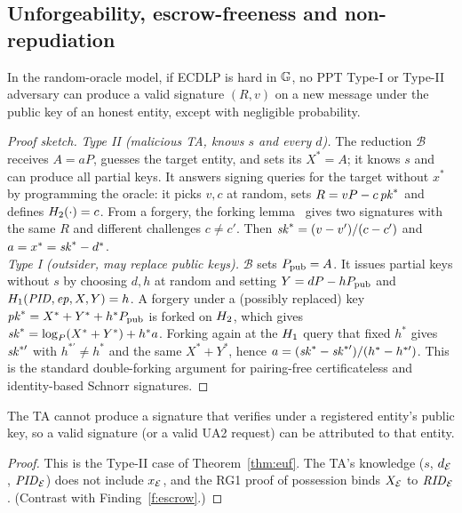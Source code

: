 \subsection{Unforgeability, escrow-freeness and non-repudiation}
\begin{theorem}\label{thm:euf}
In the random-oracle model, if ECDLP is hard in $\mathbb{G}$, no PPT Type-I or Type-II adversary can produce a valid signature $(R,v)$ on a new message under the
public key of an honest entity, except with negligible probability.
\end{theorem}
\begin{proof}[Proof sketch]
\emph{Type II (malicious TA, knows $s$ and every $d$).} The reduction $\mathcal{B}$ receives $A=aP$, guesses the target entity, and sets its
$X^*=A$; it knows $s$ and can produce all partial keys. It answers signing queries for the target without $x^*$ by programming the oracle: it picks
$v,c$ at random, sets $R=vP-c\,\mathit{pk}^*$ and defines $H_2(\cdot)=c$. From a forgery, the forking lemma~\cite{forking} gives two signatures with the same $R$ and
different challenges $c\ne c'$. Then $\mathit{sk}^*=(v-v')/(c-c')$ and $a=x^*=\mathit{sk}^*-d^*$.\\
\emph{Type I (outsider, may replace public keys).} $\mathcal{B}$ sets $P_{\mathrm{pub}}=A$. It issues partial keys without $s$ by choosing $d,h$ at random and setting
$Y=dP-hP_{\mathrm{pub}}$ and $H_1(\mathit{PID},\mathit{ep},X,Y)=h$. A forgery under a (possibly replaced) key $\mathit{pk}^*=X^*+Y^*+h^*P_{\mathrm{pub}}$ is forked on $H_2$, which gives
$\mathit{sk}^*=\log_P(X^*+Y^*)+h^*a$. Forking again at the $H_1$ query that fixed $h^*$ gives $\mathit{sk}^{*\prime}$ with $h^{*\prime}\ne h^*$ and the same $X^*+Y^*$, hence
$a=(\mathit{sk}^*-\mathit{sk}^{*\prime})/(h^*-h^{*\prime})$. This is the standard double-forking argument for pairing-free certificateless and identity-based Schnorr signatures.
\end{proof}

\begin{theorem}\label{thm:escrow}
The TA cannot produce a signature that verifies under a registered entity's public key, so a valid signature (or a valid UA2 request) can be attributed to that entity.
\end{theorem}
\begin{proof}
This is the Type-II case of Theorem~\ref{thm:euf}. The TA's knowledge ($s$, $d_{\mathcal{E}}$, $\mathit{PID}_{\mathcal{E}}$) does not include $x_{\mathcal{E}}$, and the RG1 proof of possession binds
$X_{\mathcal{E}}$ to $\mathit{RID}_{\mathcal{E}}$. (Contrast with Finding~\ref{f:escrow}.)
\end{proof}


